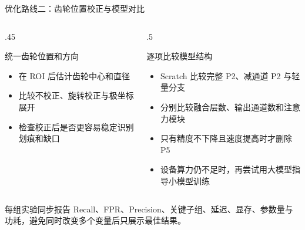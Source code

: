 \documentclass[aspectratio=169,10pt]{beamer}
\begin{document}
\begin{frame}{优化路线二：齿轮位置校正与模型对比}
  \begin{columns}[T,onlytextwidth]
    \begin{column}{.45\textwidth}
      \begin{block}{统一齿轮位置和方向}
        \setlength{\rightskip}{.6em}
        \begin{itemize}
          \item 在 ROI 后估计齿轮中心和直径
          \item 比较不校正、旋转校正与极坐标展开
          \item 检查校正后是否更容易稳定识别划痕和缺口
        \end{itemize}
      \end{block}
    \end{column}
    \begin{column}{.5\textwidth}
      \begin{block}{逐项比较模型结构}
        \setlength{\rightskip}{.6em}
        \begin{itemize}
          \item Scratch 比较完整 P2、减通道 P2 与轻量分支
          \item 分别比较融合层数、输出通道数和注意力模块
          \item 只有精度不下降且速度提高时才删除 P5
          \item 设备算力仍不足时，再尝试用大模型指导小模型训练
        \end{itemize}
      \end{block}
    \end{column}
  \end{columns}

  \vfill
  每组实验同步报告 Recall、FPR、Precision、关键子组、延迟、显存、参数量与功耗，避免同时改变多个变量后只展示最佳结果。
\end{frame}
\end{document}
